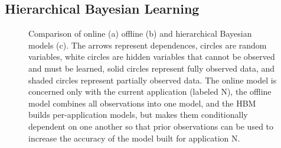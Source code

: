 \subsection{Hierarchical Bayesian Learning}
\label{sec:framework:HBM}
\begin{figure}

  \caption{ Comparison of online (a) offline (b) and hierarchical
    Bayesian models (c).  The arrows represent dependences, circles
    are random variables, white circles are hidden variables that
    cannot be observed and must be learned, solid circles represent
    fully observed data, and shaded circles represent partially
    observed data.  The online model is concerned only with the
    current application (labeled N), the offline model combines all
    observations into one model, and the HBM builds per-application
    models, but makes them conditionally dependent on one another so
    that prior observations can be used to increase the accuracy of
    the model built for application N.}
\label{fig:learning-models}
\end{figure}

